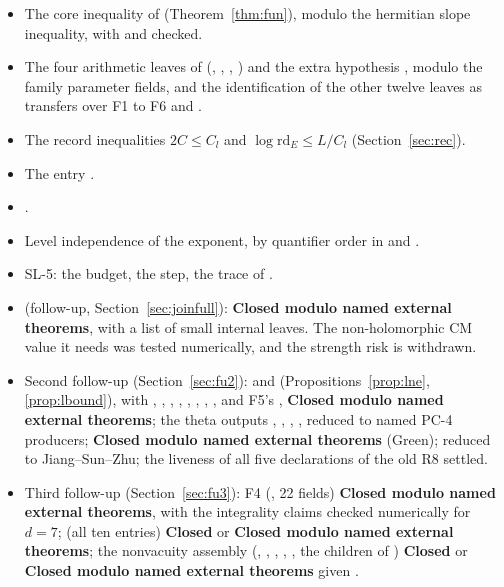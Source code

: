 \documentclass[11pt]{article}
\newcommand{\PC}[1]{\textsf{PC-#1}}
\newcommand{\SL}[1]{\textsf{SL-#1}}
\newcommand{\sC}{\textbf{Closed}}
\newcommand{\sE}{\textbf{Closed modulo named external theorems}}
\theoremstyle{remark}
\begin{document}
\begin{itemize}[nosep]
\item The core inequality of  (Theorem~\ref{thm:fun}), modulo the hermitian slope inequality, with  and  checked.
\item The four arithmetic leaves of  (, , , ) and the extra hypothesis , modulo the family parameter fields, and the identification of the other twelve leaves as transfers over F1 to F6 and .
\item The record inequalities $2C\le C_l$ and $\log\mathrm{rd}_E\le L/C_l$ (Section~\ref{sec:rec}).
\item The  entry .
\item {}.
\item Level independence of the  exponent, by quantifier order in  and .
\item \SL{5}: the  budget, the  step, the trace of .
\item {} (follow-up, Section~\ref{sec:joinfull}): \sE, with a list of small internal leaves. The non-holomorphic CM value it needs was tested numerically, and the strength risk is withdrawn.
\item Second follow-up (Section~\ref{sec:fu2}):  and  (Propositions~\ref{prop:lne}, \ref{prop:lbound}), with , , , , , , , ,  and F5's , \sE; the theta outputs , , , ,  reduced to named \PC{4} producers;  \sE{} (Green);  reduced to Jiang--Sun--Zhu; the liveness of all five declarations of the old R8 settled.
\item Third follow-up (Section~\ref{sec:fu3}): F4 (, 22 fields) \sE, with the integrality claims checked numerically for $d=7$;  (all ten entries) \sC{} or \sE; the nonvacuity assembly (, , , , , the children of ) \sC{} or \sE{} given .

\end{itemize}
\end{document}
